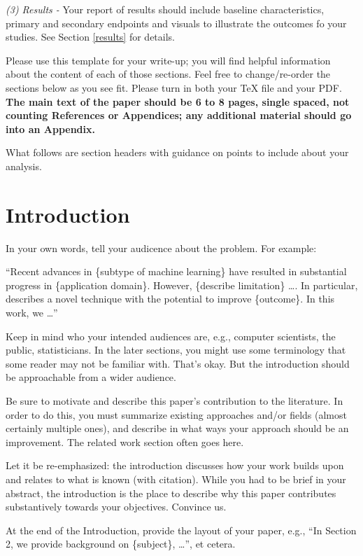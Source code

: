 \documentclass[twoside,11pt]{article}
\begin{document}
\emph{(3) Results -} Your report of results should include baseline characteristics, primary and secondary endpoints and visuals to illustrate the outcomes fo your studies. See Section \ref{results} for details.

\vspace{0.5em}
Please use this template for your write-up; you will find helpful information about the content of each of those sections. Feel free to change/re-order the sections below as you see fit. Please turn in both your TeX file and your PDF. \textbf{The main text of the paper should be 6 to 8 pages, single spaced, not counting References or Appendices; any additional material should go into an Appendix.}

\vspace{0.5em}
What follows are section headers with guidance on points to include about your analysis.

\section{Introduction}
In your own words, tell your audicence about the problem. For example:

``Recent advances in \{subtype of machine learning\} \citep{cite1} have resulted in substantial progress in \{application domain\}. However, \{describe limitation\} \dots.
In particular, \citet{cite2} describes a novel technique with the potential to improve \{outcome\}.
In this work, we \dots''

Keep in mind who your intended audiences are, e.g., computer scientists, the public, statisticians.
In the later sections, you might use some terminology that some reader may not be familiar with.
That's okay. But the introduction should be approachable from a wider audience.

Be sure to motivate and describe this paper's contribution to the literature.
In order to do this, you must summarize existing approaches and/or fields (almost certainly multiple ones),
and describe in what ways your approach should be an improvement. The related work section often goes here.

Let it be re-emphasized: the introduction discusses how your work builds upon and relates to what is known (with citation). While you had to be brief in your abstract, the introduction is the place to describe why this paper contributes substantively towards your objectives. Convince us.

At the end of the Introduction, provide the layout of your paper, e.g., ``In Section 2, we provide background on \{subject\}, \dots'',  et cetera.
\end{document}
